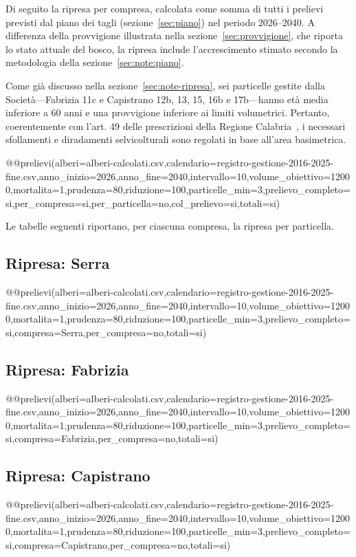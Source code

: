 Di seguito la ripresa per compresa, calcolata come somma di tutti i prelievi
previsti dal piano dei tagli (sezione~\ref{sec:piano}) nel periodo 2026--2040. A
differenza della provvigione illustrata nella sezione~\ref{sec:provvigione}, che
riporta lo stato attuale del bosco, la ripresa include l'accrescimento stimato
secondo la metodologia della sezione~\ref{sec:note:piano}.

Come già discusso nella sezione~\ref{sec:note-ripresa}, sei particelle gestite
dalla Società---Fabrizia 11c e Capistrano 12b, 13, 15, 16b e 17b---hanno età
media inferiore a 60 anni e una provvigione inferiore ai limiti volumetrici.
Pertanto, coerentemente con l'art. 49 delle prescrizioni della Regione
Calabria~\cite{calabria:2011}, i necessari sfollamenti e diradamenti
selvicolturali sono regolati in base all'area basimetrica.

@@prelievi(alberi=alberi-calcolati.csv,calendario=registro-gestione-2016-2025-fine.csv,anno_inizio=2026,anno_fine=2040,intervallo=10,volume_obiettivo=12000,mortalita=1,prudenza=80,riduzione=100,particelle_min=3,prelievo_completo=si,per_compresa=si,per_particella=no,col_prelievo=si,totali=si)

Le tabelle seguenti riportano, per ciascuna compresa, la ripresa per
particella.

\subsection*{Ripresa: Serra}
@@prelievi(alberi=alberi-calcolati.csv,calendario=registro-gestione-2016-2025-fine.csv,anno_inizio=2026,anno_fine=2040,intervallo=10,volume_obiettivo=12000,mortalita=1,prudenza=80,riduzione=100,particelle_min=3,prelievo_completo=si,compresa=Serra,per_compresa=no,totali=si)

\subsection*{Ripresa: Fabrizia}
@@prelievi(alberi=alberi-calcolati.csv,calendario=registro-gestione-2016-2025-fine.csv,anno_inizio=2026,anno_fine=2040,intervallo=10,volume_obiettivo=12000,mortalita=1,prudenza=80,riduzione=100,particelle_min=3,prelievo_completo=si,compresa=Fabrizia,per_compresa=no,totali=si)

\subsection*{Ripresa: Capistrano}
@@prelievi(alberi=alberi-calcolati.csv,calendario=registro-gestione-2016-2025-fine.csv,anno_inizio=2026,anno_fine=2040,intervallo=10,volume_obiettivo=12000,mortalita=1,prudenza=80,riduzione=100,particelle_min=3,prelievo_completo=si,compresa=Capistrano,per_compresa=no,totali=si)
